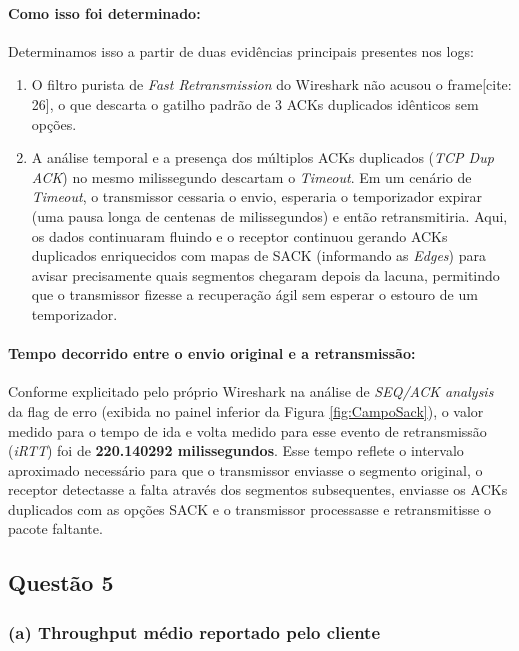 \documentclass[
    12pt,
    a4paper,
    oneside
]{article}
\begin{document}
\paragraph{Como isso foi determinado:} 
Determinamos isso a partir de duas evidências principais presentes nos logs:
\begin{enumerate}
    \item O filtro purista de \textit{Fast Retransmission} do Wireshark não acusou o frame[cite: 26], o que descarta o gatilho padrão de 3 ACKs duplicados idênticos sem opções.
    \item A análise temporal e a presença dos múltiplos ACKs duplicados (\textit{TCP Dup ACK}) no mesmo milissegundo descartam o \textit{Timeout}. Em um cenário de \textit{Timeout}, o transmissor cessaria o envio, esperaria o temporizador expirar (uma pausa longa de centenas de milissegundos) e então retransmitiria. Aqui, os dados continuaram fluindo e o receptor continuou gerando ACKs duplicados enriquecidos com mapas de SACK (informando as \textit{Edges}) para avisar precisamente quais segmentos chegaram depois da lacuna, permitindo que o transmissor fizesse a recuperação ágil sem esperar o estouro de um temporizador.
\end{enumerate}

\paragraph{Tempo decorrido entre o envio original e a retransmissão:}
Conforme explicitado pelo próprio Wireshark na análise de \textit{SEQ/ACK analysis} da flag de erro (exibida no painel inferior da Figura \ref{fig:CampoSack}), o valor medido para o tempo de ida e volta medido para esse evento de retransmissão (\textit{iRTT}) foi de \textbf{220.140292 milissegundos}. Esse tempo reflete o intervalo aproximado necessário para que o transmissor enviasse o segmento original, o receptor detectasse a falta através dos segmentos subsequentes, enviasse os ACKs duplicados com as opções SACK e o transmissor processasse e retransmitisse o pacote faltante.



\subsection{Questão 5}
\subsubsection*{(a) Throughput médio reportado pelo cliente}
\end{document}
